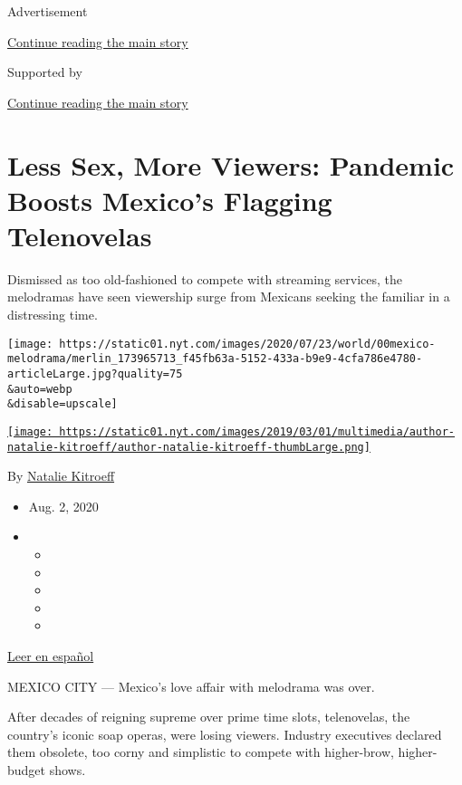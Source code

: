 Advertisement

\protect\hyperlink{after-top}{Continue reading the main story}

Supported by

\protect\hyperlink{after-sponsor}{Continue reading the main story}

\hypertarget{less-sex-more-viewers-pandemic-boosts-mexicos-flagging-telenovelas}{%
\section{Less Sex, More Viewers: Pandemic Boosts Mexico's Flagging
Telenovelas}\label{less-sex-more-viewers-pandemic-boosts-mexicos-flagging-telenovelas}}

Dismissed as too old-fashioned to compete with streaming services, the
melodramas have seen viewership surge from Mexicans seeking the familiar
in a distressing time.

\texttt{[image: https://static01.nyt.com/images/2020/07/23/world/00mexico-melodrama/merlin\_173965713\_f45fb63a-5152-433a-b9e9-4cfa786e4780-articleLarge.jpg?quality=75\\\&auto=webp\\\&disable=upscale]}

\href{https://www.nytimes.com/by/natalie-kitroeff}{\texttt{[image: https://static01.nyt.com/images/2019/03/01/multimedia/author-natalie-kitroeff/author-natalie-kitroeff-thumbLarge.png]}}

By \href{https://www.nytimes.com/by/natalie-kitroeff}{Natalie Kitroeff}

\begin{itemize}
\item
  Aug. 2, 2020
\item
  \begin{itemize}
  \item
  \item
  \item
  \item
  \item
  \end{itemize}
\end{itemize}

\href{https://www.nytimes.com/es/2020/08/02/espanol/america-latina/televisa-rosa-de-guadalupe-netflix.html}{Leer
en español}

MEXICO CITY --- Mexico's love affair with melodrama was over.

After decades of reigning supreme over prime time slots, telenovelas,
the country's iconic soap operas, were losing viewers. Industry
executives declared them obsolete, too corny and simplistic to compete
with higher-brow, higher-budget shows.

